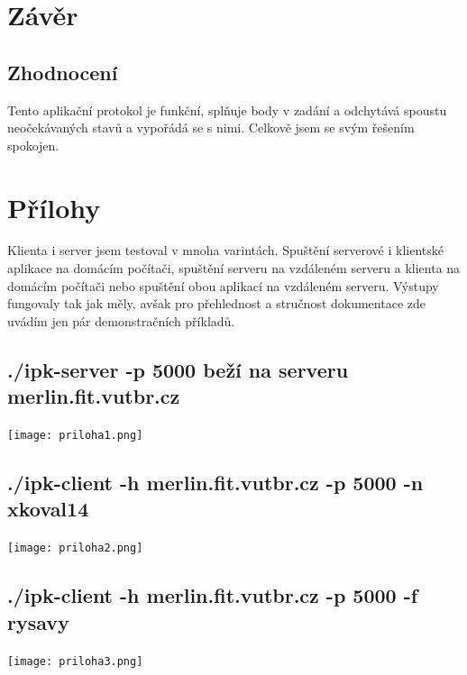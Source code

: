 \documentclass[11pt]{article}
\begin{document}
	
		
	\section{Závěr}
		
			\begin{adjustwidth}{1cm}{0cm}
				\subsection{Zhodnocení}
				\begin{flushleft}
				Tento aplikační protokol je funkční, splňuje body v zadání a odchytává spoustu neočekávaných stavů a vypořádá se s nimi. Celkově jsem se svým řešením spokojen.\par
				\end{flushleft}
			\end{adjustwidth}						
	\vfill
	
	\newpage		
	\section{Přílohy}
			Klienta i server jsem testoval v mnoha varintách. Spuštění serverové i klientské aplikace na domácím počítači, spuštění serveru na vzdáleném serveru a klienta na domácím počítači nebo spuštění obou aplikací na vzdáleném serveru. Výstupy fungovaly tak jak měly, avšak pro přehlednost a stručnost dokumentace zde uvádím jen pár demonstračních příkladů.
		\subsection{./ipk-server -p 5000 beží na serveru merlin.fit.vutbr.cz}
	\begin{center}
		\texttt{[image: priloha1.png]}\\
	\end{center}

	\subsection{./ipk-client -h merlin.fit.vutbr.cz -p 5000 -n xkoval14}
	\begin{center}
		\texttt{[image: priloha2.png]}\\
	\end{center}
	
	\subsection{./ipk-client -h merlin.fit.vutbr.cz -p 5000 -f rysavy}
	\begin{center}
		\texttt{[image: priloha3.png]}\\
	\end{center}
	
\end{document}
